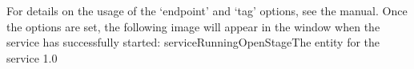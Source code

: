 For details on the usage of the `endpoint' and `tag' options, see the \emph{\MMMU} manual.
Once the options are set, the following image will appear in the \emph{\MMMU} window when
the service has successfully started:
%
{serviceRunningOpenStage}{The \emph{\MMMU} entity for the \emph{\OSI} service}%
{1.0}
\secondaryEnd
\primaryEnd{}
